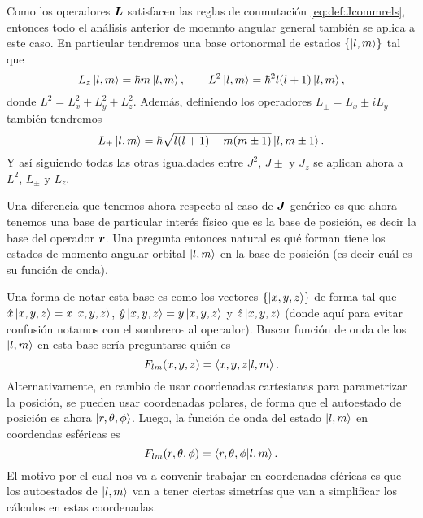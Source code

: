 \documentclass[10pt, a4paper]{article}
\newcommand{\lpmprefact}{\hbar\sqrt{l(l+1) - m(m\pm1)}}
\numberwithin{equation}{subsection}
\begin{document}
\bigbreak

Como los operadores $\vb*{L}$ satisfacen las reglas de conmutación
\eqref{eq:def:Jcommrels}, entonces todo el análisis anterior de moemnto angular
general también se aplica a este caso. En particular tendremos una base
ortonormal de estados $\set{\ket{l,m}}$ tal que
\begin{equation}
  L_z\ket{l,m} = \hbar m\ket{l,m}, \qquad L^2\ket{l,m} = \hbar^2
  l(l+1)\ket{l,m},
\end{equation}
donde $L^2 = L_x^2 + L_y^2 + L_z^2$. Además, definiendo los operadores $L_\pm =
L_x \pm iL_y$ también tendremos
\begin{equation}
  L_\pm\ket{l,m} = \lpmprefact\ket{l,m\pm1}.
\end{equation}
Y así siguiendo todas las otras igualdades entre $J^2$, $J\pm$ y $J_z$ se
aplican ahora a $L^2$, $L_\pm$ y $L_z$.

\bigbreak

Una diferencia que tenemos ahora respecto al caso de $\vb*{J}$ genérico es que
ahora tenemos una base de particular interés físico que es la base de posición,
es decir la base del operador $\vb*{r}$. Una pregunta entonces natural es qué
forman tiene los estados de momento angular orbital $\ket{l,m}$ en la base de
posición (es decir cuál es su función de onda).

Una forma de notar esta base es como los vectores $\set{\ket{x,y,z}}$ de forma
tal que $\hat{x}\ket{x,y,z} = x\ket{x,y,z}$, $\hat{y}\ket{x,y,z} =
y\ket{x,y,z}$ y $\hat{z}\ket{x,y,z}$ (donde aquí para evitar confusión notamos
con el sombrero $\hat{}$ al operador). Buscar función de onda de los
$\ket{l,m}$ en esta base sería preguntarse quién es
\begin{equation}
  F_{lm}(x, y, z) = \braket{x,y,z}{l,m}.
\end{equation}
Alternativamente, en cambio de usar coordenadas cartesianas para parametrizar
la posición, se pueden usar coordenadas polares, de forma que el autoestado de
posición es ahora $\ket{r, \theta, \phi}$. Luego, la función de onda del estado
$\ket{l,m}$ en coordendas esféricas es
\begin{equation}
  F_{lm}(r,\theta,\phi) = \braket{r,\theta,\phi}{l,m}.
\end{equation}
El motivo por el cual nos va a convenir trabajar en coordenadas eféricas es que
los autoestados de $\ket{l,m}$ van a tener ciertas simetrías que van a
simplificar los cálculos en estas coordenadas.

\bigbreak
\end{document}
